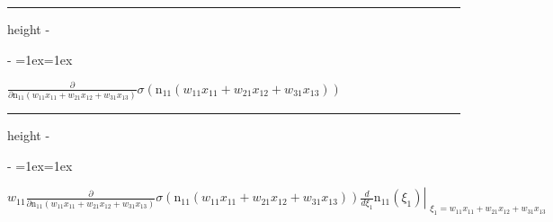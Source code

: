 \documentclass[letterpaper,10pt,english]{sphinxmanual}
\makeatletter
\newenvironment{nbsphinxfancyoutput}{%
    \let\sphinxincludegraphics\nbsphinxincludegraphics
    \nbsphinx@image@maxheight\textheight
    \advance\nbsphinx@image@maxheight -2\fboxsep   %
    \advance\nbsphinx@image@maxheight -2\fboxrule  %
    \advance\nbsphinx@image@maxheight -\baselineskip
\def\nbsphinxfcolorbox{\spx@fcolorbox{nbsphinx-code-border}{white}}%
\def\FrameCommand{\nbsphinxfcolorbox\nbsphinxfancyaddprompt\@empty}%
\def\FirstFrameCommand{\nbsphinxfcolorbox\nbsphinxfancyaddprompt\sphinxVerbatim@Continues}%
\def\MidFrameCommand{\nbsphinxfcolorbox\sphinxVerbatim@Continued\sphinxVerbatim@Continues}%
\def\LastFrameCommand{\nbsphinxfcolorbox\sphinxVerbatim@Continued\@empty}%
\MakeFramed{\advance\hsize-\width\@totalleftmargin\z@\linewidth\hsize\@setminipage}%
\lineskip=1ex\lineskiplimit=1ex\raggedright%
}{\par\unskip\@minipagefalse\endMakeFramed}
\def\nbsphinxfancyaddprompt{\ifvoid\nbsphinxpromptbox\else
    \kern\fboxrule\kern\fboxsep
    \copy\nbsphinxpromptbox
    \kern-\ht\nbsphinxpromptbox\kern-\dp\nbsphinxpromptbox
    \kern-\fboxsep\kern-\fboxrule\nointerlineskip
    \fi}
\newlength\nbsphinxcodecellspacing
\newcommand*{\nbsphinxincludegraphics}[2][]{%
    \gdef\spx@includegraphics@options{#1}%
    \setbox\spx@image@box\hbox{\texttt{[image: \#2]}}%
    \in@false
    \ifdim \wd\spx@image@box>\linewidth
      \g@addto@macro\spx@includegraphics@options{,width=\linewidth}%
      \in@true
    \fi
    \ifdim \ht\spx@image@box>\nbsphinx@image@maxheight
      \g@addto@macro\spx@includegraphics@options{,height=\nbsphinx@image@maxheight}%
      \in@true
    \fi
    \ifin@
      \g@addto@macro\spx@includegraphics@options{,keepaspectratio}%
    \fi
    \setbox\spx@image@box\box\voidb@x %
    \expandafter\includegraphics\expandafter[\spx@includegraphics@options]{#2}%
}%
\makeatother
\begin{document}
{
\begin{sphinxVerbatim}[commandchars=\\\{\}]
\llap{\color{nbsphinxin}[52]:\,\hspace{\fboxrule}\hspace{\fboxsep}}\PYG{p}{[}\PYG{p}{]}\PYG{p}{[}\PYG{p}{]}\PYG{p}{[}\PYG{p}{]}
\end{sphinxVerbatim}
}

\hrule height -\fboxrule\relax
\vspace{\nbsphinxcodecellspacing}

\savebox\nbsphinxpromptbox[0pt][r]{\color{nbsphinxout}\Verb|\strut{[52]:}\,|}

\begin{nbsphinxfancyoutput}
$\displaystyle \frac{\partial}{\partial \operatorname{n_{11}}{\left(w_{11} x_{11} + w_{21} x_{12} + w_{31} x_{13} \right)}} \sigma{\left(\operatorname{n_{11}}{\left(w_{11} x_{11} + w_{21} x_{12} + w_{31} x_{13} \right)} \right)}$
\end{nbsphinxfancyoutput}

{
\begin{sphinxVerbatim}[commandchars=\\\{\}]
\llap{\color{nbsphinxin}[53]:\,\hspace{\fboxrule}\hspace{\fboxsep}}\PYG{p}{[}\PYG{p}{]}\PYG{p}{[}\PYG{p}{]}
\end{sphinxVerbatim}
}

\hrule height -\fboxrule\relax
\vspace{\nbsphinxcodecellspacing}

\savebox\nbsphinxpromptbox[0pt][r]{\color{nbsphinxout}\Verb|\strut{[53]:}\,|}

\begin{nbsphinxfancyoutput}
$\displaystyle w_{11} \frac{\partial}{\partial \operatorname{n_{11}}{\left(w_{11} x_{11} + w_{21} x_{12} + w_{31} x_{13} \right)}} \sigma{\left(\operatorname{n_{11}}{\left(w_{11} x_{11} + w_{21} x_{12} + w_{31} x_{13} \right)} \right)} \left. \frac{d}{d \xi_{1}} \operatorname{n_{11}}{\left(\xi_{1} \right)} \right|_{\substack{ \xi_{1}=w_{11} x_{11} + w_{21} x_{12} + w_{31} x_{13} }}$
\end{nbsphinxfancyoutput}
\end{document}
